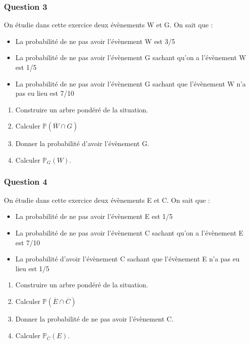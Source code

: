 \documentclass[15pt, mathserif]{beamer}
\newcommand{\Prem}{\mathbb{P}}	%
\begin{document}
\begin{frame} 
	\frametitle{Question 3}
On étudie dans cette exercice deux évènements W et G. On sait que : 
 
 \begin{itemize} 
 	 \item La probabilité de ne pas avoir l'évènement W est 3/5 
 	 \item La probabilité de ne pas avoir l'évènement G sachant qu'on a l'évènement W est 1/5 
 	 \item La probabilité de ne pas avoir l'évènement G sachant que l'évènement W n'a pas eu lieu est 7/10
 \end{itemize} 
 
 \begin{enumerate} 
 	 \item Construire un arbre pondéré de la situation. 
 	 \item Calculer $\Prem(\overline{W} \cap G)$
 	 \item Donner la probabilité d'avoir l'évènement G. 
 \item Calculer $\Prem_{G}(W)$. 
 \end{enumerate} \end{frame}


\begin{frame} 
	\frametitle{Question 4}
On étudie dans cette exercice deux évènements E et C. On sait que : 
 
 \begin{itemize} 
 	 \item La probabilité de ne pas avoir l'évènement E est 1/5
 	  \item La probabilité de ne pas avoir l'évènement C sachant qu'on a l'évènement E est 7/10 
 	 \item La probabilité d'avoir l'évènement C sachant que l'évènement E n'a pas eu lieu est 1/5
 \end{itemize} 
 
 \begin{enumerate} 
 	 \item Construire un arbre pondéré de la situation. 
 	 \item Calculer $\Prem(\overline{E} \cap \overline{C})$
 	 \item Donner la probabilité de ne pas avoir l'évènement C. 
 \item Calculer $\Prem_{\overline{C}}(E)$. 
 \end{enumerate} \end{frame}
\end{document}
